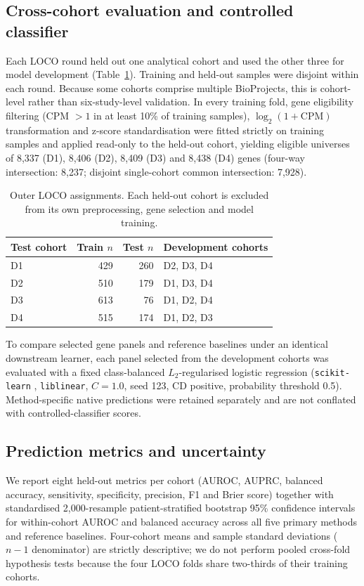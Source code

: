 \subsection{Cross-cohort evaluation and controlled classifier}
\label{sec:evaluation_design}
Each LOCO round held out one analytical cohort and used the other three for model development (Table~\ref{tab:splits}). Training and held-out samples were disjoint within each round. Because some cohorts comprise multiple BioProjects, this is cohort-level rather than six-study-level validation. In every training fold, gene eligibility filtering (CPM $>1$ in at least 10\% of training samples), $\log_2(1+\mathrm{CPM})$ transformation and z-score standardisation were fitted strictly on training samples and applied read-only to the held-out cohort, yielding eligible universes of 8,337 (D1), 8,406 (D2), 8,409 (D3) and 8,438 (D4) genes (four-way intersection: 8,237; disjoint single-cohort common intersection: 7,928).

\begin{table}[!t]
\caption{Outer LOCO assignments. Each held-out cohort is excluded from its own preprocessing, gene selection and model training.}
\label{tab:splits}
\centering\footnotesize
\begin{tabular}{@{}lrrl@{}}
\toprule
Test cohort & Train $n$ & Test $n$ & Development cohorts\\
\midrule
D1 & 429 & 260 & D2, D3, D4\\
D2 & 510 & 179 & D1, D3, D4\\
D3 & 613 & 76 & D1, D2, D4\\
D4 & 515 & 174 & D1, D2, D3\\
\bottomrule
\end{tabular}
\end{table}

To compare selected gene panels and reference baselines under an identical downstream learner, each panel selected from the development cohorts was evaluated with a fixed class-balanced $L_2$-regularised logistic regression (\texttt{scikit-learn} \cite{pedregosa2011scikit}, \texttt{liblinear}, $C=1.0$, seed 123, CD positive, probability threshold 0.5). Method-specific native predictions were retained separately and are not conflated with controlled-classifier scores.

\subsection{Prediction metrics and uncertainty}
\label{sec:predictive_metrics}
We report eight held-out metrics per cohort (AUROC, AUPRC, balanced accuracy, sensitivity, specificity, precision, F1 and Brier score) together with standardised 2,000-resample patient-stratified bootstrap 95\% confidence intervals for within-cohort AUROC and balanced accuracy across all five primary methods and reference baselines. Four-cohort means and sample standard deviations ($n-1$ denominator) are strictly descriptive; we do not perform pooled cross-fold hypothesis tests because the four LOCO folds share two-thirds of their training cohorts.

